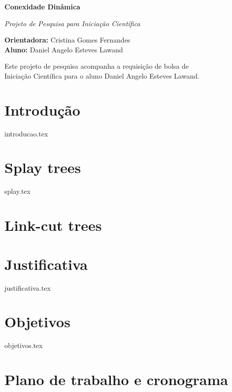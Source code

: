 \documentclass[12pt]{article}
\begin{document}
\begin{center}

{\Large {\bf Conexidade Dinâmica}} 

{\large {\em Projeto de Pesquisa para Iniciação Científica}

}

\vspace{0.2cm}
{\small 
{\bf Orientadora:} Cristina Gomes Fernandes \\
{\bf Aluno:} Daniel Angelo Esteves Lawand
}

\vspace{5mm} 

{\small Este projeto de pesquisa acompanha a requisição de bolsa de \\ 
  Iniciação Científica para o aluno Daniel Angelo Esteves Lawand.}

\end{center}

\section{Introdução}
{introducao.tex}

\section{Splay trees}
{splay.tex}

\section{Link-cut trees}

\section{Justificativa}
{justificativa.tex}

\section{Objetivos}
{objetivos.tex}


\section{Plano de trabalho e cronograma}
\end{document}
